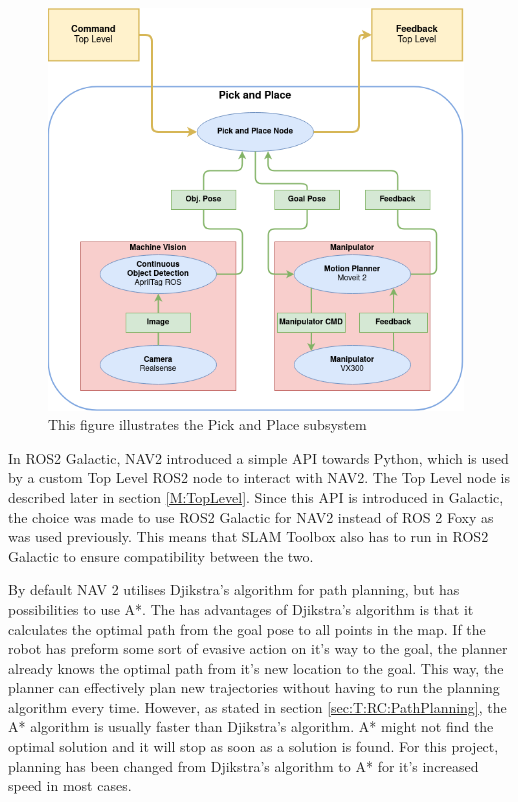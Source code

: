 \begin{figure}[htp]
  \centering
  \includegraphics[width = 0.98\textwidth]{Figures/figPickAndPlaceMethod.drawio.png}
  \caption{This figure illustrates the Pick and Place subsystem}
  \label{fig:M:PAP:PickAndPlaceMethod}
\end{figure}

In ROS2 Galactic, NAV2 introduced a simple API towards Python, which is used by a custom Top Level ROS2 node to interact with NAV2. The Top Level node is described later in section \ref{M:TopLevel}. Since this API is introduced in Galactic, the choice was made to use ROS2 Galactic for NAV2 instead of ROS 2 Foxy as was used previously. This means that SLAM Toolbox also has to run in ROS2 Galactic to ensure compatibility between the two.

By default NAV 2 utilises Djikstra's algorithm for path planning, but has possibilities to use A*. The has advantages of Djikstra's algorithm is that it calculates the optimal path from the goal pose to all points in the map. If the robot has preform some sort of evasive action on it's way to the goal, the planner already knows the optimal path from it's new location to the goal. This way, the planner can effectively plan new trajectories without having to run the planning algorithm every time. However, as stated in section \ref{sec:T:RC:PathPlanning}, the A* algorithm is usually faster than Djikstra's algorithm. A* might not find the optimal solution and it will stop as soon as a solution is found. For this project, planning has been changed from Djikstra's algorithm to A* for it's increased speed in most cases.

